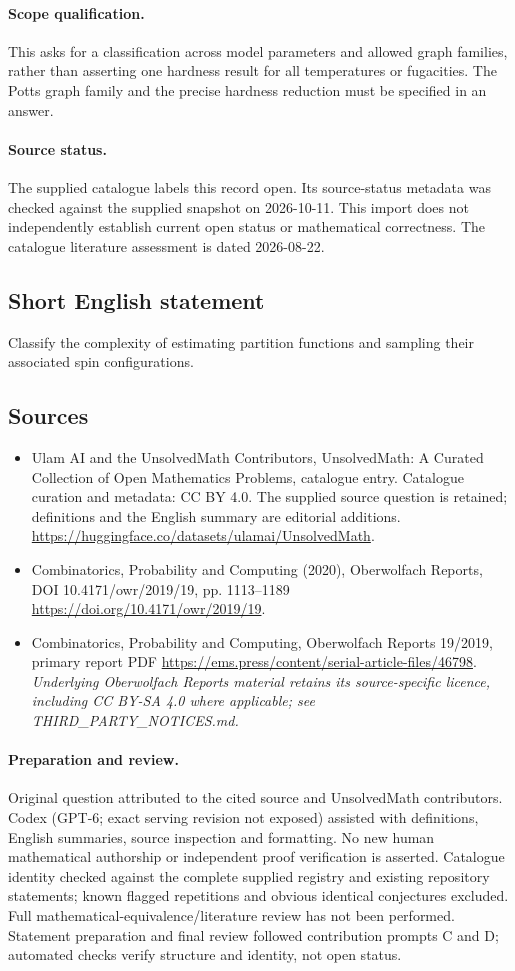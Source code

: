 \documentclass[11pt]{article}
\begin{document}
\paragraph{Scope qualification.}
This asks for a classification across model parameters and allowed graph families, rather than asserting one hardness result for all temperatures or fugacities. The Potts graph family and the precise hardness reduction must be specified in an answer.
\paragraph{Source status.}
The supplied catalogue labels this record open. Its source-status metadata was checked against the supplied snapshot on 2026-10-11. This import does not independently establish current open status or mathematical correctness. The catalogue literature assessment is dated 2026-08-22.
\subsection{Short English statement}
Classify the complexity of estimating partition functions and sampling their associated spin configurations.
\subsection{Sources}
\begin{itemize}
\item[S1] Ulam AI and the UnsolvedMath Contributors, UnsolvedMath: A Curated Collection of Open Mathematics Problems, catalogue entry. Catalogue curation and metadata: CC BY 4.0. The supplied source question is retained; definitions and the English summary are editorial additions.
\url{https://huggingface.co/datasets/ulamai/UnsolvedMath}.
\item[S2] Combinatorics, Probability and Computing (2020), Oberwolfach Reports, DOI 10.4171/owr/2019/19, pp. 1113--1189
\url{https://doi.org/10.4171/owr/2019/19}.
\item[S3] Combinatorics, Probability and Computing, Oberwolfach Reports 19/2019, primary report PDF
\url{https://ems.press/content/serial-article-files/46798}.
\textit{Underlying Oberwolfach Reports material retains its source-specific licence, including CC BY-SA 4.0 where applicable; see THIRD\_PARTY\_NOTICES.md.}
\end{itemize}
\paragraph{Preparation and review.}
Original question attributed to the cited source and UnsolvedMath contributors. Codex (GPT-6; exact serving revision not exposed) assisted with definitions, English summaries, source inspection and formatting. No new human mathematical authorship or independent proof verification is asserted. Catalogue identity checked against the complete supplied registry and existing repository statements; known flagged repetitions and obvious identical conjectures excluded. Full mathematical-equivalence/literature review has not been performed. Statement preparation and final review followed contribution prompts C and D; automated checks verify structure and identity, not open status.
\label{end:statement}
\end{document}
